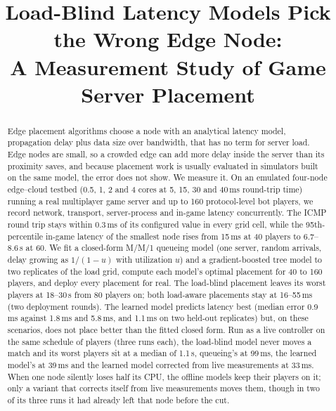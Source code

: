 \documentclass[conference]{IEEEtran}
\begin{document}
\title{Load-Blind Latency Models Pick the Wrong Edge Node:\\
A Measurement Study of Game Server Placement}

\author{}

\maketitle

\begin{abstract}
Edge placement algorithms choose a node with an analytical latency model,
propagation delay plus data size over bandwidth, that has no term for server
load. Edge nodes are small, so a crowded edge can add more delay inside the
server than its proximity saves, and because placement work is usually
evaluated in simulators built on the same model, the error does not show. We
measure it. On an emulated four-node edge--cloud testbed (0.5, 1, 2 and 4
cores at 5, 15, 30 and 40\,ms round-trip time) running a real multiplayer
game server and up to 160 protocol-level bot players, we record network,
transport, server-process and in-game latency concurrently. The ICMP round
trip stays within 0.3\,ms of its configured value in every grid cell, while the 95th-percentile in-game
latency of the smallest node rises from 15\,ms at 40 players to 6.7--8.6\,s at
60. We fit a closed-form M/M/1 queueing model (one server, random arrivals, delay growing as $1/(1-u)$ with utilization $u$) and a gradient-boosted tree model to
two replicates of the load grid, compute each model's optimal placement for
40 to 160 players, and deploy every placement for real. The load-blind
placement leaves its worst players at 18--30\,s from 80 players on; both
load-aware placements stay at 16--55\,ms (two deployment rounds). The learned model predicts latency
best (median error 0.9\,ms against 1.8\,ms and 5.8\,ms, and 1.1\,ms on two
held-out replicates) but, on these scenarios, does not place better than
the fitted closed form. Run as a live controller on the same schedule of
players (three runs each), the load-blind model never moves a match and its
worst players sit at a median of 1.1\,s, queueing's at 99\,ms, the learned
model's at 39\,ms and the learned model corrected from live measurements at
33\,ms. When one node silently loses half its CPU, the offline
models keep their players on it; only a variant that corrects itself from
live measurements moves them, though in two of its three runs it had already
left that node before the cut.
\end{abstract}
\end{document}
